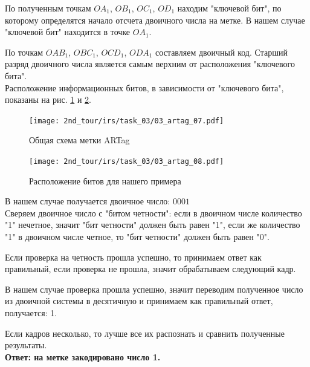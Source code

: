 По полученным точкам $OA_1$, $OB_1$, $OC_1$, $OD_1$ находим "ключевой бит", по которому определятся начало отсчета двоичного числа на метке. В нашем случае "ключевой бит" находится в точке $OA_1$.

По точкам $OAB_1$, $OBC_1$, $OCD_1$, $ODA_1$ составляем двоичный код. Старший разряд двоичного числа является самым верхним от расположения "ключевого бита". 
\\

Расположение информационных битов, в зависимости от "ключевого бита", показаны на рис. \ref{fig:03_artag_07} и \ref{fig:03_artag_08}.
\begin{figure}[h!]
	\centering
	\texttt{[image: 2nd\_tour/irs/task\_03/03\_artag\_07.pdf]}
	\label{fig:03_artag_07}
	\caption{Общая схема метки ARTag}
\end{figure}

\begin{figure}[h!]
	\centering
	\texttt{[image: 2nd\_tour/irs/task\_03/03\_artag\_08.pdf]}
	\label{fig:03_artag_08}
	\caption{Расположение битов для нашего примера}
\end{figure}

В нашем случае получается двоичное число: $0001$ \\
Сверяем двоичное число с "битом четности": если в двоичном числе количество "1" нечетное, значит "бит четности" должен быть равен "1", если же количество "1" в двоичном числе четное, то "бит четности" должен быть равен "0".

Если проверка на четность прошла успешно, то принимаем ответ как правильный, если проверка не прошла, значит обрабатываем следующий кадр.

В нашем случае проверка прошла успешно, значит переводим полученное число из двоичной системы в десятичную и принимаем как правильный ответ, получается: 1.

Если кадров несколько, то лучше все их распознать и сравнить полученные результаты.
\\

\textbf{Ответ: на метке закодировано число 1.}

\codeExample

